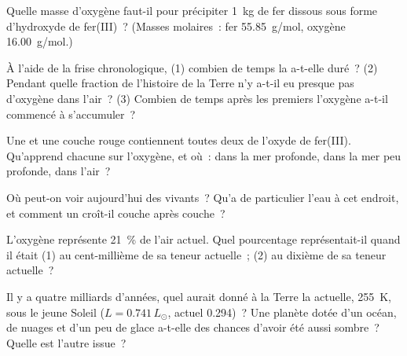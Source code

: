 \begin{exercise}[$\star\star$]\label{exo:g12:early-earth:7}
Quelle masse d'oxygène faut-il pour précipiter \qty{1}{kg} de fer dissous
sous forme d'hydroxyde de fer(III)~? (Masses molaires~: fer
\qty{55.85}{g/mol}, oxygène \qty{16.00}{g/mol}.)
\end{exercise}

\begin{exercise}[$\star\star$]\label{exo:g12:early-earth:8}
À l'aide de la frise chronologique, (1) combien de temps la  a-t-elle duré~? (2) Pendant quelle fraction de l'histoire de la
Terre n'y a-t-il eu presque pas d'oxygène dans l'air~? (3) Combien de temps
après les premiers  l'oxygène a-t-il commencé à s'accumuler~?
\end{exercise}

\begin{exercise}[$\star\star$]\label{exo:g12:early-earth:9}
Une  et une couche rouge contiennent toutes deux de
l'oxyde de fer(III). Qu'apprend chacune sur l'oxygène, et où~: dans la mer
profonde, dans la mer peu profonde, dans l'air~?
\end{exercise}

\begin{exercise}[$\star\star$]\label{exo:g12:early-earth:10}
Où peut-on voir aujourd'hui des  vivants~? Qu'a de
particulier l'eau à cet endroit, et comment un  croît-il
couche après couche~?
\end{exercise}

\begin{exercise}[$\star\star$]\label{exo:g12:early-earth:11}
L'oxygène représente \qty{21}{\percent} de l'air actuel. Quel pourcentage
représentait-il quand il était (1) au cent-millième de sa teneur
actuelle~; (2) au dixième de sa teneur actuelle~?
\end{exercise}

\begin{exercise}[$\star\star\star$]\label{exo:g12:early-earth:12}
Il y a quatre milliards d'années, quel  aurait donné à la Terre la
 actuelle, \qty{255}{K}, sous le jeune Soleil
($L = 0.741\,L_\odot$,  actuel 0.294)~? Une planète dotée d'un océan,
de nuages et d'un peu de glace a-t-elle des chances d'avoir été aussi
sombre~? Quelle est l'autre issue~?
\end{exercise}

